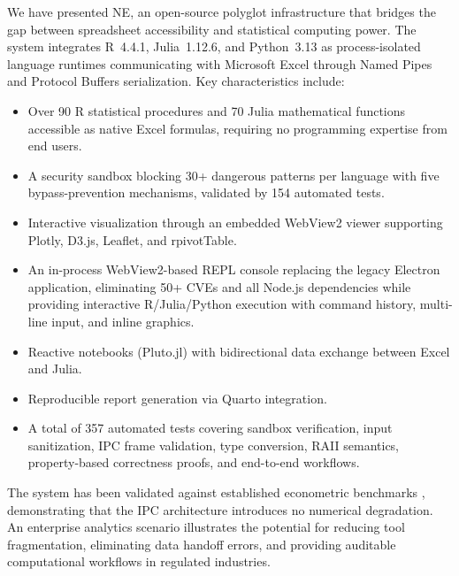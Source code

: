 \documentclass[preprint,12pt,authoryear]{elsarticle}
\newcommand{\neven}{NE\raisebox{0.2ex}{v}\rotatebox[origin=c]{180}{E}\rotatebox[origin=c]{180}{N}}
\begin{document}
We have presented \neven{}, an open-source polyglot infrastructure that bridges the gap between spreadsheet accessibility and statistical computing power. The system integrates R~4.4.1, Julia~1.12.6, and Python~3.13 as process-isolated language runtimes communicating with Microsoft Excel through Named Pipes and Protocol Buffers serialization. Key characteristics include:

\begin{itemize}
    \item Over 90 R statistical procedures and 70 Julia mathematical functions accessible as native Excel formulas, requiring no programming expertise from end users.
    \item A security sandbox blocking 30+ dangerous patterns per language with five bypass-prevention mechanisms, validated by 154 automated tests.
    \item Interactive visualization through an embedded WebView2 viewer supporting Plotly, D3.js, Leaflet, and rpivotTable.
    \item An in-process WebView2-based REPL console replacing the legacy Electron application, eliminating 50+ CVEs and all Node.js dependencies while providing interactive R/Julia/Python execution with command history, multi-line input, and inline graphics.
    \item Reactive notebooks (Pluto.jl) with bidirectional data exchange between Excel and Julia.
    \item Reproducible report generation via Quarto integration.
    \item A total of 357 automated tests covering sandbox verification, input sanitization, IPC frame validation, type conversion, RAII semantics, property-based correctness proofs, and end-to-end workflows.
\end{itemize}

The system has been validated against established econometric benchmarks \citep{Wooldridge2016}, demonstrating that the IPC architecture introduces no numerical degradation. An enterprise analytics scenario illustrates the potential for reducing tool fragmentation, eliminating data handoff errors, and providing auditable computational workflows in regulated industries.
\end{document}
